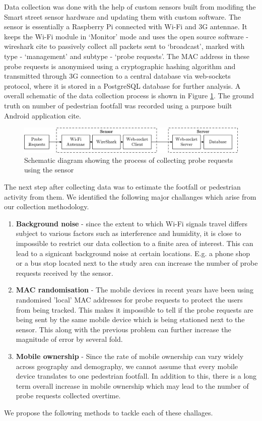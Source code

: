Data collection was done with the help of custom sensors built from modifing the Smart street sensor \citep{sss2016} hardware and updating them with custom software.
The sensor is essentially a Raspberry Pi connected with Wi-Fi and 3G antennae.
It keeps the Wi-Fi module in `Monitor' mode and uses the open source software - wireshark cite to passively collect all packets sent to `broadcast', marked with type - `management' and subtype - `probe requests'.
The MAC address in these probe requests is anonymised using a cryptographic hashing algorithm and transmitted through 3G connection to a central database via web-sockets protocol, where it is stored in a PostgreSQL database for further analysis.
A overall schematic of the data collection process is shown in Figure \ref{datacollection_schematic}.
The ground truth on number of pedestrian footfall was recorded using a purpose built Android application cite. 

\begin{figure}
	\centering
	\includegraphics[width=\linewidth]{images/datacollection_schematic.jpeg}
	\caption{Schematic diagram showing the process of collecting probe requests using the sensor} \label{datacollection_schematic}
\end{figure}

The next step after collecting data was to estimate the footfall or pedestrian activity from them. We identified the following major challanges which arise from our collection methodology.
\begin{enumerate}
	\item \textbf{Background noise} - since the extent to which Wi-Fi signals travel differs subject to various factors such as interference and humidity, it is close to impossible to restrict our data collection to a finite area of interest. This can lead to a signicant background noise at certain locations. E.g. a phone shop or a bus stop located next to the study area can increase the number of probe requests received by the sensor.
	\item \textbf{MAC randomisation} - The mobile devices in recent years have been using randomised 'local' MAC addresses for probe requests to protect the users from being tracked. This makes it impossible to tell if the probe requests are being sent by the same mobile device which is being stationed next to the sensor. This along with the previous problem can further increase the magnitude of error by several fold.
	\item \textbf{Mobile ownership} - Since the rate of mobile ownership can vary widely across geography and demography, we cannot assume that every mobile device translates to one pedestrian footfall. In addition to this, there is a long term overall increase in mobile ownership which may lead to the number of probe requests collected overtime. 
\end{enumerate}
We propose the following methods to tackle each of these challages.

